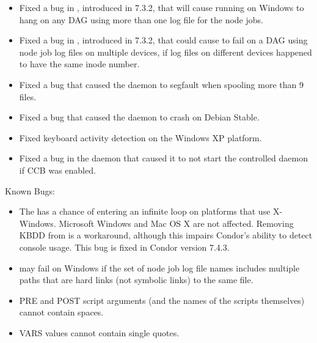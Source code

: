 \begin{itemize}


\item Fixed a bug in , introduced in 7.3.2, that will
cause  running on Windows to hang on any DAG using
more than one log file for the node jobs.

\item Fixed a bug in , introduced in 7.3.2, that could
cause  to fail on a DAG using node job log files on
multiple devices, if log files on different devices happened to have
the same inode number.

\item Fixed a bug that caused the  daemon to segfault when
spooling more than 9 files.

\item Fixed a bug that caused the  daemon to crash on
Debian Stable.

\item Fixed keyboard activity detection on the Windows XP platform.

\item Fixed a bug in the  daemon that caused it to not start
the controlled daemon if CCB was enabled.

\end{itemize}

\noindent Known Bugs:

\begin{itemize}

\item The  has a chance of entering an infinite loop
on platforms that use X-Windows.  Microsoft Windows and Mac OS X
are not affected.  Removing KBDD from  is a
workaround, although this impairs Condor's ability to detect
console usage.  This bug is fixed in Condor version 7.4.3.

\item {} may fail on Windows if the set of node job log
file names includes multiple paths that are hard links (not symbolic links)
to the same file.

\item {} PRE and POST script arguments (and the names of
the scripts themselves) cannot contain spaces.

\item {} VARS values cannot contain single quotes.

\end{itemize}

